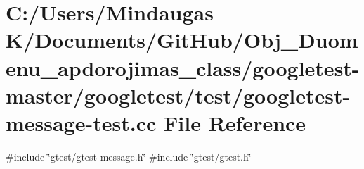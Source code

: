 \hypertarget{googletest-master_2googletest_2test_2googletest-message-test_8cc}{}\section{C\+:/\+Users/\+Mindaugas K/\+Documents/\+Git\+Hub/\+Obj\+\_\+\+Duomenu\+\_\+apdorojimas\+\_\+class/googletest-\/master/googletest/test/googletest-\/message-\/test.cc File Reference}
\label{googletest-master_2googletest_2test_2googletest-message-test_8cc}
{\ttfamily \#include \char`\"{}gtest/gtest-\/message.\+h\char`\"{}}\newline
{\ttfamily \#include \char`\"{}gtest/gtest.\+h\char`\"{}}\newline
